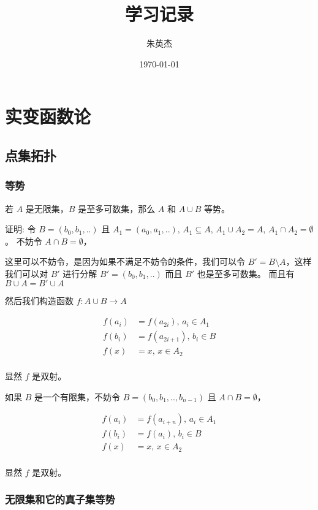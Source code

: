 \documentclass[12pt,a4paper]{ctexart}
\title{学习记录}
\author{朱英杰}
\date{\today}
\begin{document}
\maketitle
\tableofcontents

\section{实变函数论}

\subsection{点集拓扑}

\subsubsection{等势}

若 $A$ 是无限集，$B$ 是至多可数集，那么 $A$ 和 $A \cup B$ 等势。

证明: 令 $B = (b_0, b_1, ..)$ 且 $A_1 = (a_0, a_1, .. ),\, A_1 \subseteq A,\, A_1 \cup A_2 = A,\, A_1 \cap A_2 = \emptyset$。
不妨令  $A \cap B = \emptyset$，

这里可以不妨令，是因为如果不满足不妨令的条件，我们可以令 $B' = B \setminus A$，这样我们可以对 $B'$ 进行分解 $B' = (b_0,b_1,..)$ 而且 $B'$ 也是至多可数集。
而且有 $B \cup A = B' \cup A$

然后我们构造函数  $f: A \cup B \to A$

\begin{align*}
    f(a_i) &= f(a_{2i}),\, a_i \in A_1 \\
    f(b_i) &= f(a_{2i+1}),\, b_i \in B \\
    f(x) &= x,\, x \in A_2 \\
\end{align*}

显然 $f$ 是双射。

如果 $B$ 是一个有限集，不妨令 $B=(b_0,b_1,..,b_{n-1})$ 且 $A \cap B = \emptyset$，

\begin{align*}
    f(a_i) &= f(a_{i+n}),\, a_i \in A_1 \\
    f(b_i) &= f(a_{i}),\, b_i \in B \\
    f(x) &= x,\, x \in A_2 \\
\end{align*}


显然 $f$ 是双射。

\subsubsection{无限集和它的真子集等势}
\end{document}
